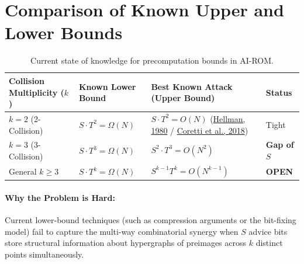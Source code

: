 \documentclass[11pt,a4paper]{article}
\begin{document}
\section{Comparison of Known Upper and Lower Bounds}

\begin{table}[h!]
\centering
\small
\begin{tabular}{@{}llll@{}}
\toprule
\textbf{Collision Multiplicity ($k$)} & \textbf{Known Lower Bound} & \textbf{Best Known Attack (Upper Bound)} & \textbf{Status} \\ \midrule
$k = 2$ (2-Collision) & $S \cdot T^2 = \Omega(N)$ & $S \cdot T^2 = O(N)$ (\href{https://www-ee.stanford.edu/~hellman/publications/36.pdf}{Hellman, 1980} / \href{https://eprint.iacr.org/2017/937.pdf}{Coretti et al., 2018}) & Tight \\
$k = 3$ (3-Collision) & $S \cdot T^3 = \Omega(N)$ & $S^2 \cdot T^3 = O(N^2)$ & \textbf{Gap of $S$} \\
General $k \ge 3$ & $S \cdot T^k = \Omega(N)$ & $S^{k-1} T^k = O(N^{k-1})$ & \textbf{OPEN} \\ \bottomrule
\end{tabular}
\caption{Current state of knowledge for precomputation bounds in AI-ROM.}
\end{table}

\paragraph{Why the Problem is Hard:}
Current lower-bound techniques (such as compression arguments or the bit-fixing model) fail to capture the multi-way combinatorial synergy when $S$ advice bits store structural information about hypergraphs of preimages across $k$ distinct points simultaneously.
\end{document}
